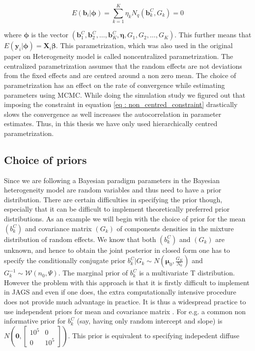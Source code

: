 \begin{equation}
\label{eq : non_centred_constraint}
E(\boldsymbol{b}_i | \boldsymbol{\phi}) = \sum_{k=1}^{K} \eta_k N_q(\boldsymbol{b}_k^C, G_k) = 0
\end{equation}

where $\boldsymbol{\phi}$ is the vector $(\boldsymbol{b}_1^C, \boldsymbol{b}_2^C, \ldots, \boldsymbol{b}_K^C, \boldsymbol{\eta}, G_1, G_2, \ldots, G_K)$. This further means that $E(\boldsymbol{y}_i | \boldsymbol{\phi}) = \boldsymbol{X}_{i}\boldsymbol{\beta}$. This parametrization, which was also used in the original paper on Heterogeneity model \citep{verbeke_linear_1996} is called noncentralized parametrization. The centralized parametrization assumes that the random effects are not deviations from the fixed effects and are centred around a non zero mean.
The choice of parametrization has an effect on the rate of convergence while estimating parameters using MCMC. While doing the simulation study we figured out that imposing the constraint in equation \ref{eq : non_centred_constraint} drastically slows the convergence as well increases the autocorrelation in parameter estimates. Thus, in this thesis we have only used hierarchically centred parametrization.

\subsection{Choice of priors}
\label{subsec : choice_priors}
Since we are following a Bayesian paradigm parameters in the Bayesian heterogeneity model are random variables and thus need to have a prior distribution. There are certain difficulties in specifying the prior though, especially that it can be difficult to implement theoretically preferred prior distributions. As an example we will begin with the choice of prior for the mean $(b_k^C)$ and covariance matrix $(G_k)$ of components densities in the mixture distribution of random effects. We know that both $(b_k^C)$ and $(G_k)$ are unknown, and hence to obtain the joint posterior in closed form one has to specify the conditionally conjugate prior $b_k^C | G_k \sim N(\boldsymbol{\mu}_0, \frac {G_K} {N_0})$ and $G_k^{-1} \sim \mathcal{W} (n_0, \Psi)$. The marginal prior of $b_k^C$ is a multivariate T distribution. However the problem with this approach is that it is firstly difficult to implement in JAGS and even if one does, the extra computationally intensive procedure does not provide much advantage in practice. It is thus a widespread practice to use independent priors for mean and covariance matrix \citep[chap. 17]{gelman_data_2006}. For e.g. a common non informative prior for $b_k^C$ (say, having only random intercept and slope) is $N(\boldsymbol{0}, \begin{bmatrix}10^5 & 0 \\ 0 & 10^5\end{bmatrix})$. This prior is equivalent to specifying indepedent diffuse univariate normal priors for random intercept mean and random slope mean.

